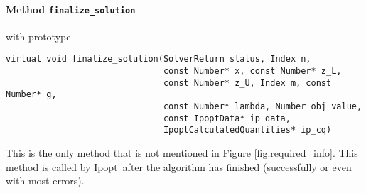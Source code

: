 \documentclass[10pt]{article}
\newcommand{\Ipopt}{{\sc Ipopt}}
\begin{document}
\paragraph{Method \texttt{finalize\_solution}} with prototype

\begin{verbatim}
virtual void finalize_solution(SolverReturn status, Index n,
                               const Number* x, const Number* z_L,
                               const Number* z_U, Index m, const Number* g,
                               const Number* lambda, Number obj_value,
                               const IpoptData* ip_data,
                               IpoptCalculatedQuantities* ip_cq)
\end{verbatim}
This is the only method that is not mentioned in Figure
\ref{fig.required_info}. This method is called by \Ipopt\ after the
algorithm has finished (successfully or even with most errors).
\end{document}
